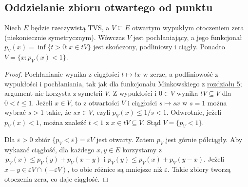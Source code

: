 \subsection{Oddzielanie zbioru otwartego od punktu}

\begin{lemat}\label{lem:open-gauge}
Niech $E$ będzie rzeczywistą TVS, a $V\subseteq E$ otwartym
wypukłym otoczeniem zera (niekoniecznie symetrycznym).
Wówczas $V$ jest pochłaniający, a jego funkcjonał
$p_V(x)=\inf\{t>0:x\in tV\}$ jest skończony, podliniowy i ciągły.
Ponadto $V=\{x:p_V(x)<1\}$.
\end{lemat}
\begin{proof}
Pochłanianie wynika z ciągłości $t\mapsto tx$ w zerze,
a podliniowość z wypukłości i pochłaniania, tak jak dla
funkcjonału Minkowskiego z \hyperref[sec:lokalnie-wypukle]{rozdziału 5}; argument nie korzysta
z symetrii $V$. Z wypukłości i $0\in V$ wynika
$tV\subseteq V$ dla $0<t\le1$. Jeżeli $x\in V$, to
z otwartości $V$ i ciągłości $s\mapsto sx$ w $s=1$
można wybrać $s>1$ takie, że $sx\in V$, czyli
$p_V(x)\le1/s<1$. Odwrotnie, jeżeli $p_V(x)<1$,
można znaleźć $t<1$ z $x\in tV\subseteq V$.
Stąd $V=\{p_V<1\}$.

Dla $\varepsilon>0$ zbiór $\{p_V<\varepsilon\}=\varepsilon V$
jest otwarty. Zatem $p_V$ jest górnie półciągły. Aby
wykazać ciągłość, dla każdego $x,y\in E$ korzystamy z
$\,p_V(x)\le p_V(y)+p_V(x-y)$ i
$p_V(y)\le p_V(x)+p_V(y-x)$.
Jeżeli $x-y\in\varepsilon V\cap(-\varepsilon V)$,
to obie różnice są mniejsze niż $\varepsilon$.
Takie zbiory tworzą otoczenia zera, co daje ciągłość.
\end{proof}

